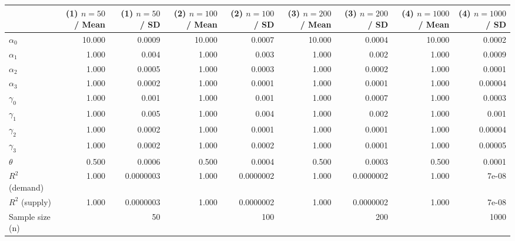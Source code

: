 
\begin{tabular}[t]{lrrrrrrrr}
\toprule
  & (1) $n=50$ / Mean & (1) $n=50$ / SD & (2) $n=100$ / Mean & (2) $n=100$ / SD & (3) $n=200$ / Mean & (3) $n=200$ / SD & (4) $n=1000$ / Mean & (4) $n=1000$ / SD\\
\midrule
$\alpha_{0}$ & 10.000 & 0.0009 & 10.000 & 0.0007 & 10.000 & 0.0004 & 10.000 & 0.0002\\
$\alpha_{1}$ & 1.000 & 0.004 & 1.000 & 0.003 & 1.000 & 0.002 & 1.000 & 0.0009\\
$\alpha_{2}$ & 1.000 & 0.0005 & 1.000 & 0.0003 & 1.000 & 0.0002 & 1.000 & 0.0001\\
$\alpha_{3}$ & 1.000 & 0.0002 & 1.000 & 0.0001 & 1.000 & 0.0001 & 1.000 & 0.00004\\
$\gamma_{0}$ & 1.000 & 0.001 & 1.000 & 0.001 & 1.000 & 0.0007 & 1.000 & 0.0003\\
$\gamma_{1}$ & 1.000 & 0.005 & 1.000 & 0.004 & 1.000 & 0.002 & 1.000 & 0.001\\
$\gamma_{2}$ & 1.000 & 0.0002 & 1.000 & 0.0001 & 1.000 & 0.0001 & 1.000 & 0.00004\\
$\gamma_{3}$ & 1.000 & 0.0002 & 1.000 & 0.0002 & 1.000 & 0.0001 & 1.000 & 0.00005\\
$\theta$ & 0.500 & 0.0006 & 0.500 & 0.0004 & 0.500 & 0.0003 & 0.500 & 0.0001\\
$R^{2}$ (demand) & 1.000 & 0.0000003 & 1.000 & 0.0000002 & 1.000 & 0.0000002 & 1.000 & 7e-08\\
$R^{2}$ (supply) & 1.000 & 0.0000003 & 1.000 & 0.0000002 & 1.000 & 0.0000002 & 1.000 & 7e-08\\
Sample size (n) &  & 50 &  & 100 &  & 200 &  & 1000\\
\bottomrule
\end{tabular}
